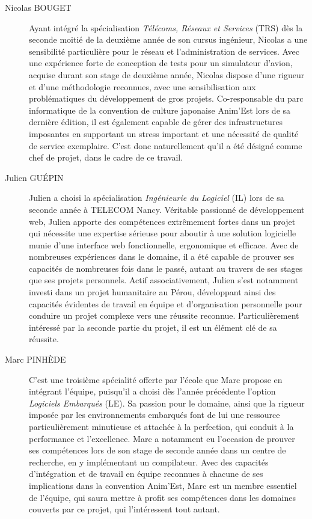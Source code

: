 \begin{description}
\item[Nicolas BOUGET] Ayant intégré la spécialisation \textit{Télécoms, Réseaux et Services} (TRS) dès la seconde moitié de la deuxième année de son cursus ingénieur, Nicolas a une sensibilité particulière pour le réseau et l'administration de services. Avec une expérience forte de conception de tests pour un simulateur d'avion, acquise durant son stage de deuxième année, Nicolas dispose d'une rigueur et d'une méthodologie reconnues, avec une sensibilisation aux problématiques du développement de gros projets. Co-responsable du parc informatique de la convention de culture japonaise Anim'Est lors de sa dernière édition, il est également capable de gérer des infrastructures imposantes en supportant un stress important et une nécessité de qualité de service exemplaire. C'est donc naturellement qu'il a été désigné comme chef de projet, dans le cadre de ce travail.\\
\item[Julien GUÉPIN] Julien a choisi la spécialisation \textit{Ingénieurie du Logiciel} (IL) lors de sa seconde année à TELECOM Nancy. Véritable passionné de développement web, Julien apporte des compétences extrêmement fortes dans un projet qui nécessite une expertise sérieuse pour aboutir à une solution logicielle munie d'une interface web fonctionnelle, ergonomique et efficace. Avec de nombreuses expériences dans le domaine, il a été capable de prouver ses capacités de nombreuses fois dans le passé, autant au travers de ses stages que ses projets personnels. Actif associativement, Julien s'est notamment investi dans un projet humanitaire au Pérou, développant ainsi des capacités évidentes de travail en équipe et d'organisation personnelle pour conduire un projet complexe vers une réussite reconnue. Particulièrement intéressé par la seconde partie du projet, il est un élément clé de sa réussite.\\
\item[Marc PINHÈDE] C'est une troisième spécialité offerte par l'école que Marc propose en intégrant l'équipe, puisqu'il a choisi dès l'année précédente l'option \textit{Logiciels Embarqués} (LE). Sa passion pour le domaine, ainsi que la rigueur imposée par les environnements embarqués font de lui une ressource particulièrement minutieuse et attachée à la perfection, qui conduit à la performance et l'excellence. Marc a notamment eu l'occasion de prouver ses compétences lors de son stage de seconde année dans un centre de recherche, en y implémentant un compilateur. Avec des capacités d'intégration et de travail en équipe reconnues à chacune de ses implications dans la convention Anim'Est, Marc est un membre essentiel de l'équipe, qui saura mettre à profit ses compétences dans les domaines couverts par ce projet, qui l'intéressent tout autant.\\

\end{description}
